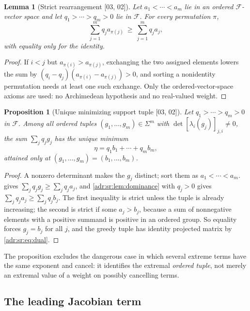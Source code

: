\documentclass[11pt,letterpaper]{article}
\numberwithin{equation}{section}
\newtheorem{lemma}[lemma]{Lemma}
\newtheorem{proposition}[proposition]{Proposition}
\theoremstyle{definition}
\theoremstyle{remark}
\newcommand{\src}[1]{\textup{[#1]}}%
\begin{document}
\begin{lemma}[Strict rearrangement \src{03, 02}]
\label{adr:sr:lem:rearrangement}
Let $a_1<\cdots<a_m$ lie in an ordered $\mathcal F$-vector space and let
$q_1>\cdots>q_m>0$ lie in $\mathcal F$. For every permutation $\pi$,
\[
 \sum_{j=1}^mq_ja_{\pi(j)}\ \ge\ \sum_{j=1}^mq_ja_j,
\]
with equality only for the identity.
\end{lemma}
\begin{proof}
If $i<j$ but $a_{\pi(i)}>a_{\pi(j)}$, exchanging the two assigned elements
lowers the sum by $(q_i-q_j)(a_{\pi(i)}-a_{\pi(j)})>0$, and sorting a
nonidentity permutation needs at least one such exchange. Only the
ordered-vector-space axioms are used: no Archimedean hypothesis and no
real-valued weight.
\end{proof}

\begin{proposition}[Unique minimizing support tuple \src{03, 02}]
\label{adr:sr:prop:unique}
Let $q_1>\cdots>q_m>0$ in $\mathcal F$. Among all ordered tuples
$(g_1,\ldots,g_m)\in\Sigma^m$ with $\det[\lambda_i(g_j)]_{j,i}\ne0$, the
sum $\sum_jq_jg_j$ has the unique minimum
\begin{equation}\label{adr:sr:eq:eta}
 \eta=q_1b_1+\cdots+q_mb_m,
\end{equation}
attained only at $(g_1,\ldots,g_m)=(b_1,\ldots,b_m)$.
\end{proposition}
\begin{proof}
A nonzero determinant makes the $g_j$ distinct; sort them as
$a_1<\cdots<a_m$.  gives
$\sum_jq_jg_j\ge\sum_jq_ja_j$, and \cref{adr:sr:lem:dominance} with $q_j>0$
gives $\sum_jq_ja_j\ge\sum_jq_jb_j$. The first inequality is strict unless the
tuple is already increasing; the second is strict if some $a_j>b_j$, because a
sum of nonnegative elements with a positive summand is positive in an ordered
group. So equality forces $g_j=b_j$ for all $j$, and the greedy tuple has
identity projected matrix by \eqref{adr:sr:eq:dual}.
\end{proof}

The proposition excludes the dangerous case in which several extreme terms
have the same exponent and cancel: it identifies the extremal \emph{ordered
tuple}, not merely an extremal value of a weight on possibly cancelling terms.

\subsection{The leading Jacobian term}
\end{document}
